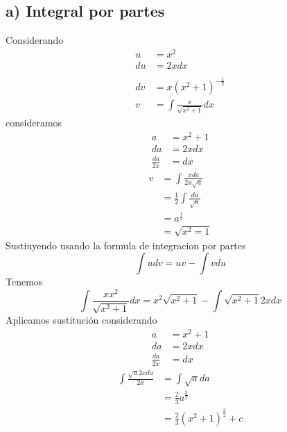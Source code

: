\documentclass[11pt,letterpaper]{article}
\begin{document}
\subsection*{a) Integral por partes}
Considerando
\begin{equation*}
  \begin{split}
    u &= x^2\\
    du &= 2xdx\\
    \\
    dv &= x(x^2+1)^{-{\frac{1}{2}}}\\
    v &= \int \frac{x}{\sqrt{x^2+1}}dx
  \end{split}
\end{equation*}
consideramos
\begin{equation*}
  \begin{split}
    a &= x^2+1\\
    da &= 2xdx\\
    \frac{da}{2x} &= dx
  \end{split}
\end{equation*}
\begin{equation*}
  \begin{split}
    v &= \int \frac{xda}{2x\sqrt{a}}\\
    &= \frac{1}{2} \int \frac{da}{\sqrt{a}}\\
    &= a^{\frac{1}{2}}\\
    &= \sqrt{x^2=1}
  \end{split}
\end{equation*}
Sustiuyendo usando la formula de integracion por partes
\begin{equation*}
  \int u dv = uv - \int v du
\end{equation*}
Tenemos
\begin{equation*}
    \int \frac{xx^2}{\sqrt{x^2+1}}dx=x^2\sqrt{x^2+1}-\int\sqrt{x^2+1}2xdx
\end{equation*}
Aplicamos sustitución considerando
\begin{equation*}
  \begin{split}
    a &= x^2+1\\
    da &= 2xdx\\
    \frac{da}{2x} &= dx
  \end{split}
\end{equation*}
\begin{equation*}
  \begin{split}
    \int\frac{\sqrt{a}2xda}{2x} &= \int \sqrt{a}da\\
    &=\frac{2}{3}a^{\frac{3}{2}}\\
    &=\frac{2}{3}(x^2+1)^{\frac{3}{2}}+c
  \end{split}
\end{equation*}
\end{document}
